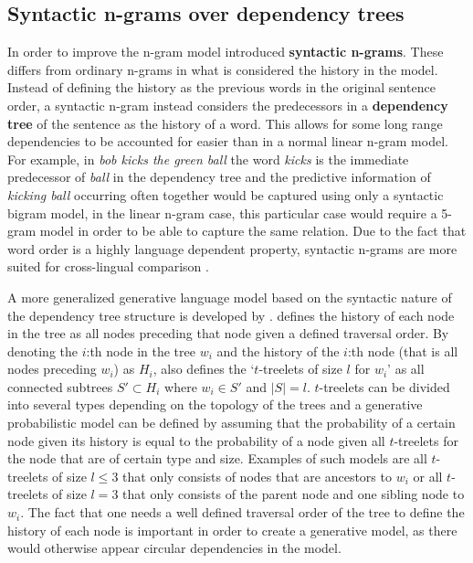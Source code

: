 \subsection{Syntactic n-grams over dependency trees}
In order to improve the n-gram model \citet{sidorov2014syntactic} introduced \textbf{syntactic n-grams}. These differs from ordinary n-grams in what is considered the history in the model. Instead of defining the history as the previous words in the original sentence order, a syntactic n-gram instead considers the predecessors in a \textbf{dependency tree} of the sentence as the history of a word. This allows for some long range dependencies to be accounted for easier than in a normal linear n-gram model. For example, in \emph{bob kicks the green ball} the word \emph{kicks} is the immediate predecessor of \emph{ball} in the dependency tree and the predictive information of \emph{kicking ball} occurring often together would be captured using only a syntactic bigram model, in the linear n-gram case, this particular case would require a 5-gram model in order to be able to capture the same relation. Due to the fact that word order is a highly language dependent property, syntactic n-grams are more suited for cross-lingual comparison \citep{sidorov2014syntactic}.%

A more generalized generative language model based on the syntactic nature of the dependency tree structure is developed by \citet{richardson2016generalized}. \citeauthor{richardson2016generalized} defines the history of each node in the tree as all nodes preceding that node given a defined traversal order. By denoting the $i$:th node in the tree $w_i$ and the history of the $i$:th node (that is all nodes preceding $w_i$) as $H_i$, \citeauthor{richardson2016generalized}  also defines the `$t$-treelets of size $l$ for $w_i$' as all connected subtrees $S'\subset H_i$ where $w_i\in S'$ and $|S|=l$. $t$-treelets can be divided into several types depending on the topology of the trees and a generative probabilistic model can be defined by assuming that the probability of a certain node given its history is equal to the probability of a node given all $t$-treelets for the node that are of certain type and size. Examples of such models are all $t$-treelets of size $l\leq 3$ that only consists of nodes that are ancestors to $w_i$ or all $t$-treelets of size $l=3$ that only consists of the parent node and one sibling node to $w_i$. The fact that one needs a well defined traversal order of the tree to define the history of each node is important in order to create a generative model, as there would otherwise appear circular dependencies in the model. 

